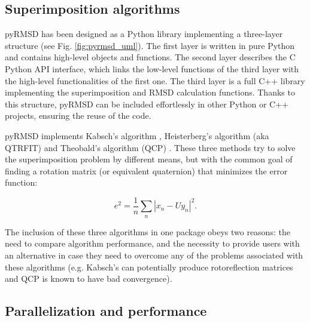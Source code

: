 \begin{sidewaysfigure}


\caption{ Pseudo-UML (Unified Modelling Language) diagram showing some key classes of pyRMSD as well as
the three-layer design (Python classes, Python C interface and C++ classes).}

\label{fig:pyrmsd_uml}

\end{sidewaysfigure}

\subsection{Superimposition algorithms}

pyRMSD has been designed as a Python library implementing a three-layer structure (see Fig.
\ref{fig:pyrmsd_uml}). The first layer is written in pure Python and contains high-level objects and
functions. The second layer describes the C Python API interface, which links the low-level functions of the third layer
with the high-level functionalities of the first one. The third layer is a full C++ library implementing the
superimposition and RMSD calculation functions. Thanks to this structure, pyRMSD can be included effortlessly in other
Python or C++ projects, ensuring the reuse of the code.



pyRMSD implements Kabsch's algorithm \cite{kabsch_solution_1976}, Heisterberg's algorithm (aka
QTRFIT) \cite{heisterberg_qtrfit_1990} and Theobald's algorithm (QCP)
\cite{theobald_rapid_2005-1}. These three methods try to solve the superimposition problem by
different means, but with the common goal of finding a rotation matrix (or equivalent quaternion) that minimizes the
error function:

\begin{equation}
e^2 = \frac{1}{n} \sum_n \left| x_n - U y_n \right| ^2 .
\end{equation}


The inclusion of these three algorithms in one package obeys two reasons: the need to compare algorithm performance, and the necessity to provide users with an alternative in case they need to overcome any of the problems associated with these algorithms (e.g. Kabsch's can potentially produce rotoreflection matrices \cite{umeyama_least-squares_1991} and QCP is known to have bad convergence).

\subsection{Parallelization and performance}

